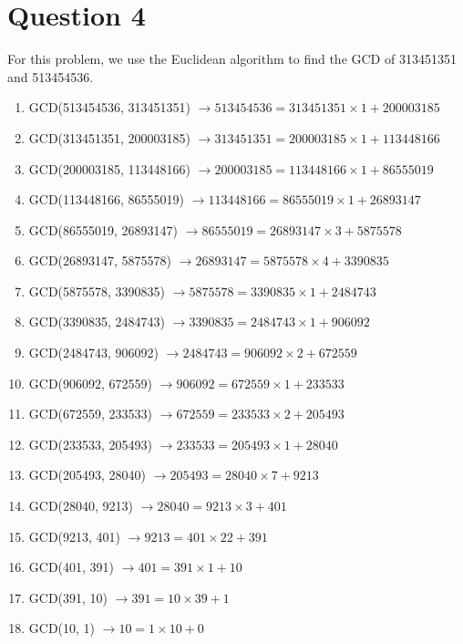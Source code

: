 \section*{Question 4}

For this problem, we use the Euclidean algorithm to find the GCD of 313451351 and 513454536.

\begin{enumerate}
    \item GCD(513454536, 313451351) $\longrightarrow 513454536 = 313451351 \times 1 + 200003185$
    \item GCD(313451351, 200003185) $\longrightarrow 313451351 = 200003185 \times 1 + 113448166$
    \item GCD(200003185, 113448166) $\longrightarrow 200003185 = 113448166 \times 1 + 86555019$
    \item GCD(113448166, 86555019) $\longrightarrow 113448166 = 86555019 \times 1 + 26893147$
    \item GCD(86555019, 26893147) $\longrightarrow 86555019 = 26893147 \times 3 + 5875578$
    \item GCD(26893147, 5875578) $\longrightarrow 26893147 = 5875578 \times 4 + 3390835$
    \item GCD(5875578, 3390835) $\longrightarrow 5875578 = 3390835 \times 1 + 2484743$
    \item GCD(3390835, 2484743) $\longrightarrow 3390835 = 2484743 \times 1 + 906092$
    \item GCD(2484743, 906092) $\longrightarrow 2484743 = 906092 \times 2 + 672559$
    \item GCD(906092, 672559) $\longrightarrow 906092 = 672559 \times 1 + 233533$
    \item GCD(672559, 233533) $\longrightarrow 672559 = 233533 \times 2 + 205493$
    \item GCD(233533, 205493) $\longrightarrow 233533 = 205493 \times 1 + 28040$
    \item GCD(205493, 28040) $\longrightarrow 205493 = 28040 \times 7 + 9213$
    \item GCD(28040, 9213) $\longrightarrow 28040 = 9213 \times 3 + 401$
    \item GCD(9213, 401) $\longrightarrow 9213 = 401 \times 22 + 391$
    \item GCD(401, 391) $\longrightarrow 401 = 391 \times 1 + 10$
    \item GCD(391, 10) $\longrightarrow 391 = 10 \times 39 + 1$
    \item GCD(10, 1) $\longrightarrow 10 = 1 \times 10 + 0$
\end{enumerate}

